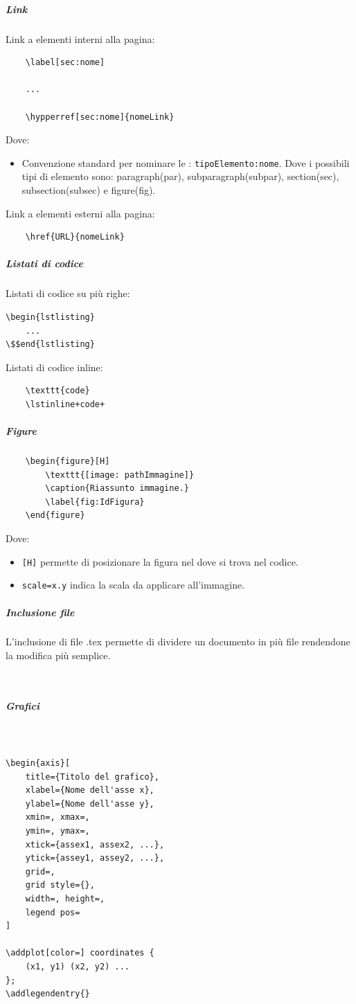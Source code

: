 \subparagraph{Link}
Link a elementi interni alla pagina:
\begin{lstlisting}
    \label[sec:nome]

    ... 

    \hypperref[sec:nome]{nomeLink}
\end{lstlisting}
Dove:
\begin{itemize}
    \item Convenzione standard per nominare le : \texttt{tipoElemento:nome}.
    Dove i possibili tipi di elemento sono: paragraph(par), subparagraph(subpar), section(sec), subsection(subsec) e figure(fig).
\end{itemize}
\noindent Link a elementi esterni alla pagina:
\begin{lstlisting}
    \href{URL}{nomeLink}
\end{lstlisting}

\subparagraph{Listati di codice}
Listati di codice su più righe:
\begin{lstlisting}[mathescape=true]
\begin{lstlisting}
    ...
\$$end{lstlisting}
\end{lstlisting}
\noindent 
Listati di codice inline:
\begin{lstlisting}
    \texttt{code}
    \lstinline+code+
\end{lstlisting}

\subparagraph{Figure}
\begin{lstlisting}
    \begin{figure}[H]
        \texttt{[image: pathImmagine]}
        \caption{Riassunto immagine.}
        \label{fig:IdFigura}
    \end{figure}
\end{lstlisting}
Dove:
\begin{itemize}
    \item \texttt{[H]} permette di posizionare la figura nel  dove si trova nel codice.
    \item \texttt{scale=x.y} indica la scala da applicare all'immagine.
\end{itemize}

\subparagraph{Inclusione file}
L'inclusione di file .tex permette di dividere un documento in più file rendendone la modifica più semplice.
\begin{lstlisting}
    
\end{lstlisting} 

\subparagraph{Grafici}
\label{subpar:grafici}
\begin{lstlisting}


\begin{axis}[
    title={Titolo del grafico},
    xlabel={Nome dell'asse x}, 
    ylabel={Nome dell'asse y},
    xmin=, xmax=,  
    ymin=, ymax=,
    xtick={assex1, assex2, ...},
    ytick={assey1, assey2, ...},
    grid=, 
    grid style={},
    width=, height=, 
    legend pos= 
]

\addplot[color=] coordinates {
    (x1, y1) (x2, y2) ...
};
\addlegendentry{}

\end{lstlisting}

